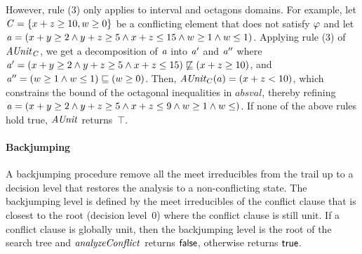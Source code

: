 However, rule (3) only applies to interval and octagons domains.  
For example, let $\mathit{C} = \{ x+z \geq 10, w \geq 0 \}$ 
be a conflicting element that does not satisfy $\varphi$ 
and let $\mathit{a}= (x+y \geq 2\wedge y+z \geq 5\wedge x+z \leq 15\wedge w \geq 1\wedge w \leq
1)$.  Applying rule (3) of $\mathit{AUnit}_{\mathit{C}}$, we get a
decomposition of $\mathit{a}$ into $\mathit{a}'$ and $\mathit{a}''$ where
$\mathit{a}'= (x+y \geq 2\wedge y+z \geq 5\wedge x+z \leq 15)
\not\sqsubseteq (x+z \geq 10)$, and $\mathit{a}''= (w \geq 1\wedge w \leq
1) \sqsubseteq (w \geq 0)$.  Then, $\mathit{AUnit}_C(a) = (x+z < 10)$, which
constrains the bound of the octagonal inequalities in $absval$, thereby 
refining $\mathit{a} = (x+y \geq 2\wedge y+z \geq 5 \wedge x+z \leq 9 
\wedge w \geq 1\wedge w \leq)$.  If none of the above rules hold true, 
$\mathit{AUnit}$ returns~$\top$.

\paragraph {\textbf{Backjumping}}
A backjumping procedure remove all the meet irreducibles from 
the trail up to a decision level that restores the analysis to a
non-conflicting state.  The backjumping level is defined by the
meet irreducibles of the conflict clause that is closest 
to the root (decision level~0) where the conflict
clause is still unit.  If a conflict clause is globally unit, then the
backjumping level is the root of the search tree and
$\mathit{analyzeConflict}$ returns $\mathsf{false}$, otherwise returns $\mathsf{true}$.


